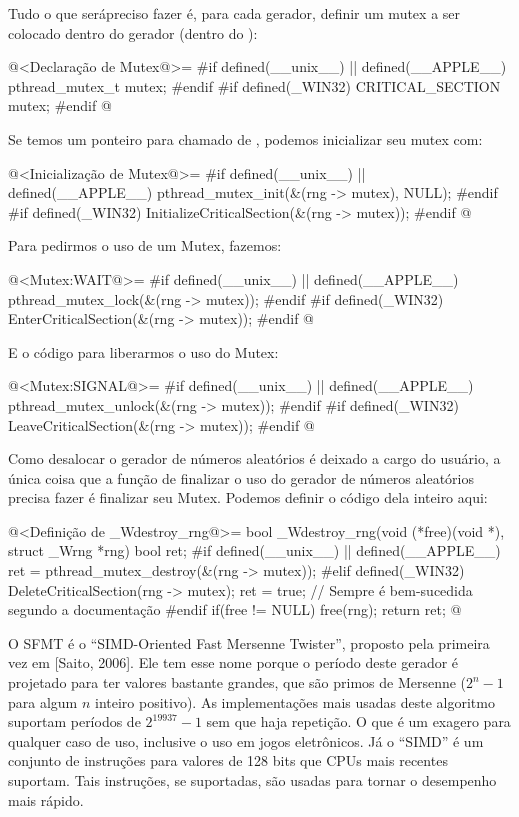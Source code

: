 Tudo o que serápreciso fazer é, para cada gerador, definir um mutex a
ser colocado dentro do gerador (dentro do ):

\iniciocodigo
@<Declaração de Mutex@>=
#if defined(__unix__) || defined(__APPLE__)
pthread_mutex_t mutex;
#endif
#if defined(_WIN32)
CRITICAL_SECTION mutex;
#endif
@
\fimcodigo

Se temos um ponteiro para  chamado
de , podemos inicializar seu mutex com:

\iniciocodigo
@<Inicialização de Mutex@>=
#if defined(__unix__) || defined(__APPLE__)
pthread_mutex_init(&(rng -> mutex), NULL);
#endif
#if defined(_WIN32)
InitializeCriticalSection(&(rng -> mutex));
#endif
@
\fimcodigo

Para pedirmos o uso de um Mutex, fazemos:

\iniciocodigo
@<Mutex:WAIT@>=
#if defined(__unix__) || defined(__APPLE__)
pthread_mutex_lock(&(rng -> mutex));
#endif
#if defined(_WIN32)
EnterCriticalSection(&(rng -> mutex));
#endif
@
\fimcodigo

E o código para liberarmos o uso do Mutex:

\iniciocodigo
@<Mutex:SIGNAL@>=
#if defined(__unix__) || defined(__APPLE__)
pthread_mutex_unlock(&(rng -> mutex));
#endif
#if defined(_WIN32)
LeaveCriticalSection(&(rng -> mutex));
#endif
@
\fimcodigo

Como desalocar o gerador de números aleatórios é deixado a cargo do
usuário, a única coisa que a função de finalizar o uso do gerador de
números aleatórios precisa fazer é finalizar seu Mutex. Podemos
definir o código dela inteiro aqui:

\iniciocodigo
@<Definição de \_Wdestroy\_rng@>=
bool _Wdestroy_rng(void (*free)(void *), struct _Wrng *rng){
  bool ret;
#if defined(__unix__) || defined(__APPLE__)
  ret = pthread_mutex_destroy(&(rng -> mutex));
#elif defined(_WIN32)
  DeleteCriticalSection(rng -> mutex);
  ret = true; // Sempre é bem-sucedida segundo a documentação
#endif
  if(free != NULL)
    free(rng);
  return ret;
}
@
\fimcodigo



O SFMT é o ``SIMD-Oriented Fast Mersenne Twister'', proposto pela
primeira vez em [Saito, 2006]. Ele tem esse nome porque o período
deste gerador é projetado para ter valores bastante grandes, que são
primos de Mersenne ($2^n-1$ para algum $n$ inteiro positivo). As
implementações mais usadas deste algoritmo suportam períodos de
$2^{19937}-1$ sem que haja repetição. O que é um exagero para qualquer
caso de uso, inclusive o uso em jogos eletrônicos. Já o ``SIMD'' é um
conjunto de instruções para valores de 128 bits que CPUs mais recentes
suportam. Tais instruções, se suportadas, são usadas para tornar o
desempenho mais rápido.

